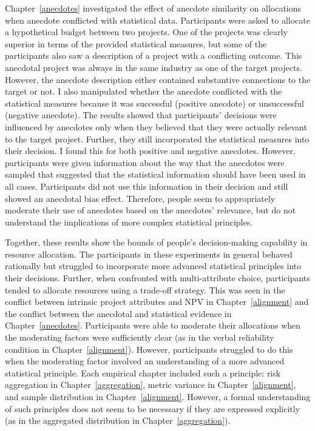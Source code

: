 \documentclass[a4paper, nobind, dvipsnames]{templates/ociamthesis}
\theoremstyle{definition}
\theoremstyle{definition}
\theoremstyle{definition}
\theoremstyle{definition}
\theoremstyle{remark}
\begin{document}
Chapter~\ref{anecdotes} investigated the effect of anecdote similarity on
allocations when anecdote conflicted with statistical data. Participants were
asked to allocate a hypothetical budget between two projects. One of the
projects was clearly superior in terms of the provided statistical measures, but
some of the participants also saw a description of a project with a conflicting
outcome. This anecdotal project was always in the same industry as one of the
target projects. However, the anecdote description either contained substantive
connections to the target or not. I also manipulated whether the anecdote
conflicted with the statistical measures because it was successful (positive
anecdote) or unsuccessful (negative anecdote). The results showed that
participants' decisions were influenced by anecdotes only when they believed
that they were actually relevant to the target project. Further, they still
incorporated the statistical measures into their decision. I found this for both
positive and negative anecdotes. However, participants were given information
about the way that the anecdotes were sampled that suggested that the
statistical information should have been used in all cases. Participants did not
use this information in their decision and still showed an anecdotal bias
effect. Therefore, people seem to appropriately moderate their use of anecdotes
based on the anecdotes' relevance, but do not understand the implications of
more complex statistical principles.

Together, these results show the bounds of people's decision-making capability
in resource allocation. The participants in these experiments in general behaved
rationally but struggled to incorporate more advanced statistical principles
into their decisions. Further, when confronted with multi-attribute choice,
participants tended to allocate resources using a trade-off strategy. This was
seen in the conflict between intrinsic project attributes and NPV in
Chapter~\ref{alignment} and the conflict between the anecdotal and statistical
evidence in Chapter~\ref{anecdotes}. Participants were able to moderate their
allocations when the moderating factors were sufficiently clear (as in the
verbal reliability condition in Chapter~\ref{alignment}). However, participants
struggled to do this when the moderating factor involved an understanding of a
more advanced statistical principle. Each empirical chapter included such a
principle: risk aggregation in Chapter~\ref{aggregation}, metric variance in
Chapter~\ref{alignment}, and sample distribution in Chapter~\ref{alignment}.
However, a formal understanding of such principles does not seem to be necessary
if they are expressed explicitly (as in the aggregated distribution in
Chapter~\ref{aggregation}).
\end{document}
